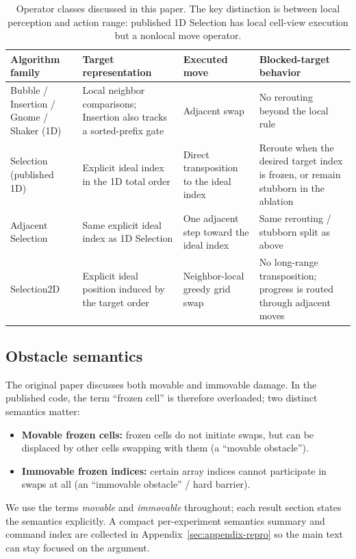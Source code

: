 \documentclass[11pt]{article}
\begin{document}
\begin{table}[t]
  \centering
  \small
  \begin{tabularx}{\linewidth}{@{}Y Y Y Y@{}}
    \toprule
    Algorithm family & Target representation & Executed move & Blocked-target behavior \\
    \midrule
    Bubble / Insertion / Gnome / Shaker (1D) & Local neighbor comparisons; Insertion also tracks a sorted-prefix gate & Adjacent swap & No rerouting beyond the local rule \\
    Selection (published 1D) & Explicit ideal index in the 1D total order & Direct transposition to the ideal index & Reroute when the desired target index is frozen, or remain stubborn in the ablation \\
    Adjacent Selection & Same explicit ideal index as 1D Selection & One adjacent step toward the ideal index & Same rerouting / stubborn split as above \\
    Selection2D & Explicit ideal position induced by the target order & Neighbor-local greedy grid swap & No long-range transposition; progress is routed through adjacent moves \\
    \bottomrule
  \end{tabularx}
  \caption{Operator classes discussed in this paper. The key distinction is between local
  perception and action range: published 1D Selection has local cell-view execution but a nonlocal
  move operator.}
  \label{tab:operator-classes}
\end{table}

\subsection{Obstacle semantics}
The original paper discusses both movable and immovable damage. In the published code, the term
``frozen cell'' is therefore overloaded; two distinct semantics matter:
\begin{itemize}
  \item \textbf{Movable frozen cells:} frozen cells do not initiate swaps, but can be displaced by
  other cells swapping with them (a ``movable obstacle'').
  \item \textbf{Immovable frozen indices:} certain array indices cannot participate in swaps at all
  (an ``immovable obstacle'' / hard barrier).
\end{itemize}
We use the terms \emph{movable} and \emph{immovable} throughout; each result section states the
semantics explicitly. A compact per-experiment semantics summary and command index are collected in
Appendix~\ref{sec:appendix-repro} so the main text can stay focused on the argument.
\end{document}
